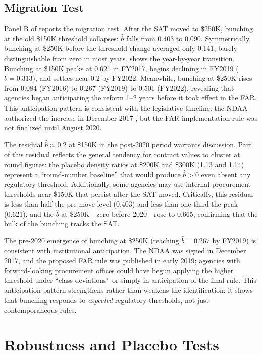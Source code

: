 \documentclass[12pt]{article}
\begin{document}
\subsection{Migration Test}

Panel B of  reports the migration test. After the SAT moved to \$250K, bunching at the old \$150K threshold collapses: $\hat{b}$ falls from 0.403 to 0.090. Symmetrically, bunching at \$250K before the threshold change averaged only 0.141, barely distinguishable from zero in most years.  shows the year-by-year transition. Bunching at \$150K peaks at 0.621 in FY2017, begins declining in FY2019 ($\hat{b} = 0.313$), and settles near 0.2 by FY2022. Meanwhile, bunching at \$250K rises from 0.084 (FY2016) to 0.267 (FY2019) to 0.501 (FY2022), revealing that agencies began anticipating the reform 1--2 years before it took effect in the FAR. This anticipation pattern is consistent with the legislative timeline: the NDAA authorized the increase in December 2017 \citep{ndaa2018}, but the FAR implementation rule was not finalized until August 2020.



The residual $\hat{b} \approx 0.2$ at \$150K in the post-2020 period warrants discussion. Part of this residual reflects the general tendency for contract values to cluster at round figures: the placebo density ratios at \$200K and \$300K (1.13 and 1.14) represent a ``round-number baseline'' that would produce $\hat{b} > 0$ even absent any regulatory threshold. Additionally, some agencies may use internal procurement thresholds near \$150K that persist after the SAT moved. Critically, this residual is less than half the pre-move level (0.403) and less than one-third the peak (0.621), and the $\hat{b}$ at \$250K---zero before 2020---rose to 0.665, confirming that the bulk of the bunching tracks the SAT.

The pre-2020 emergence of bunching at \$250K (reaching $\hat{b} = 0.267$ by FY2019) is consistent with institutional anticipation. The NDAA was signed in December 2017, and the proposed FAR rule was published in early 2019; agencies with forward-looking procurement offices could have begun applying the higher threshold under ``class deviations'' or simply in anticipation of the final rule. This anticipation pattern strengthens rather than weakens the identification: it shows that bunching responds to \textit{expected} regulatory thresholds, not just contemporaneous rules.

\section{Robustness and Placebo Tests}
\end{document}
